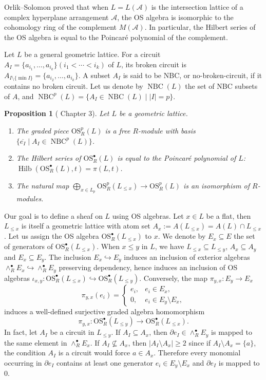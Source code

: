\documentclass{amsart}
\numberwithin{equation}{section}
\newtheorem{prop}[thm]{Proposition}
\theoremstyle{plain}
\theoremstyle{remark}
\theoremstyle{definition}
\numberwithin{equation}{section}
\newcommand{\A}{\mathcal{A}}
\newcommand{\OS}{\mathrm{OS}}
\DeclareMathOperator{\Hilb}{Hilb}
\DeclareMathOperator{\NBC}{NBC}
\begin{document}
Orlik--Solomon \cite{Orlik1980} proved that when $L=L(\A)$ is the intersection lattice of a complex hyperplane arrangement $\A$, the OS algebra is isomorphic to the cohomology ring of the complement $M(\A)$. In particular, the Hilbert series of the OS algebra is equal to the Poincar\'e polynomial of the complement.

Let $L$ be a general geometric lattice. For a circuit $A_I=\{a_{i_1},\ldots,a_{i_k}\}(i_1<\cdots<i_k)$ of $L$, its broken circuit is $A_{I\setminus\{\min I\}}=\{a_{i_2},\ldots,a_{i_k}\}$. A subset $A_I$ is said to be NBC, or no-broken-circuit, if it contains no broken circuit. Let us denote by $\NBC(L)$ the set of NBC subsets of $A$, and $\NBC^p(L)=\{A_I\in\NBC(L)\mid |I|=p\}$.

\begin{prop}[\cite{Orlik1992} Chapter 3]\label{OSproperties}
Let $L$ be a geometric lattice.
\begin{enumerate}
    \item The graded piece $\OS^p_R(L)$ is a free $R$-module with basis $\{\overline{e_I}\mid A_I\in \NBC^p(L)\}$.
    \item The Hilbert series of $\OS^\bullet_R(L)$ is equal to the Poincar\'e polynomial of $L$: $\Hilb(\OS^\bullet_R(L),t)=\pi(L,t)$.
    \item The natural map $\bigoplus_{x\in L_p}\OS^p_R(L_{\leq x})\to\OS^p_R(L)$ is an isomorphism of $R$-modules.
\end{enumerate}

\end{prop}


Our goal is to define a sheaf on $L$ using OS algebras. Let $x\in L$ be a flat, then $L_{\leq x}$ is itself a geometric lattice with atom set $A_x:=A(L_{\leq x})=A(L)\cap L_{\leq x}$. Let us assign the OS algebra $\OS_R^\bullet(L_{\leq x})$ to $x$. We denote by $E_x\subseteq E$ the set of generators of $\OS_R^\bullet(L_{\leq x})$. When $x\leq y$ in $L$, we have $L_{\leq x}\subseteq L_{\leq y}$, $A_x\subseteq A_y$ and $E_x\subseteq E_y$. The inclusion $E_x\hookrightarrow E_y$ induces an inclusion of exterior algebras $\wedge^\bullet_RE_x\hookrightarrow\wedge^\bullet_RE_y$ preserving dependency, hence induces an inclusion of OS algebras $\iota_{x,y}:\OS_R^
\bullet(L_{\leq x})\hookrightarrow \OS_R^
\bullet(L_{\leq y})$. Conversely, the map $\pi_{y,x}:E_y\to E_x$
    \[
    \pi_{y,x}(e_i)=\begin{cases}
        e_i, & e_i\in E_x,\\
        0, & e_i\in E_y\setminus E_x,
    \end{cases}
    \]
induces a well-defined surjective graded algebra homomorphism
\[
    \pi_{y,x}:\OS_R^\bullet(L_{\leq y})\to \OS_R^\bullet(L_{\leq x}).
    \]
In fact, let $A_I$ be a circuit in $L_{\leq y}$. If $A_I\subseteq A_x$, then $\partial e_I\in \wedge^\bullet_RE_y$ is mapped to the same element in $\wedge^\bullet_RE_x$. If $A_I\not\subseteq A_x$, then $|A_I\setminus A_x|\geq 2$ since if $A_I\setminus A_x=\{a\}$, the condition $A_I$ is a circuit would force $a\in A_x$. Therefore every monomial occurring in $\partial e_I$ contains at least one generator $e_i\in E_y\setminus E_x$ and $\partial e_I$ is mapped to $0$. 
\end{document}
